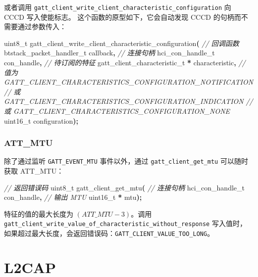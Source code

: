 \documentclass[
  12pt,
]{book}
\newenvironment{Shaded}{\begin{snugshade}}{\end{snugshade}}
\newcommand{\CommentTok}[1]{\textcolor[rgb]{0.56,0.35,0.01}{\textit{#1}}}
\newcommand{\DataTypeTok}[1]{\textcolor[rgb]{0.13,0.29,0.53}{#1}}
\newcommand{\NormalTok}[1]{#1}
\newcommand{\OperatorTok}[1]{\textcolor[rgb]{0.81,0.36,0.00}{\textbf{#1}}}
\begin{document}
\begin{enumerate}
  或者调用 \texttt{gatt\_client\_write\_client\_characteristic\_configuration} 向 CCCD 写入使能标志。
  这个函数的原型如下，它会自动发现 CCCD 的句柄而不需要通过参数传入：

\begin{Shaded}
\begin{Highlighting}[]
\DataTypeTok{uint8\_t}\NormalTok{ gatt\_client\_write\_client\_characteristic\_configuration}\OperatorTok{(}
    \CommentTok{// 回调函数}
\NormalTok{    btstack\_packet\_handler\_t callback}\OperatorTok{,}
    \CommentTok{// 连接句柄}
\NormalTok{    hci\_con\_handle\_t con\_handle}\OperatorTok{,}
    \CommentTok{// 待订阅的特征}
\NormalTok{    gatt\_client\_characteristic\_t }\OperatorTok{*}\NormalTok{ characteristic}\OperatorTok{,}
    \CommentTok{// 值为 GATT\_CLIENT\_CHARACTERISTICS\_CONFIGURATION\_NOTIFICATION}
    \CommentTok{// 或   GATT\_CLIENT\_CHARACTERISTICS\_CONFIGURATION\_INDICATION}
    \CommentTok{// 或   GATT\_CLIENT\_CHARACTERISTICS\_CONFIGURATION\_NONE}
    \DataTypeTok{uint16\_t}\NormalTok{ configuration}\OperatorTok{);}
\end{Highlighting}
\end{Shaded}

  \hypertarget{att_mtu-1}{%
  \subsection{ATT\_MTU}\label{att_mtu-1}}
\end{enumerate}

除了通过监听 \texttt{GATT\_EVENT\_MTU} 事件以外，通过 \texttt{gatt\_client\_get\_mtu} 可以随时获取 ATT\_MTU：

\begin{Shaded}
\begin{Highlighting}[]
\CommentTok{// 返回错误码}
\DataTypeTok{uint8\_t}\NormalTok{ gatt\_client\_get\_mtu}\OperatorTok{(}
    \CommentTok{// 连接句柄}
\NormalTok{    hci\_con\_handle\_t con\_handle}\OperatorTok{,}
    \CommentTok{// 输出 MTU}
    \DataTypeTok{uint16\_t} \OperatorTok{*}\NormalTok{ mtu}\OperatorTok{);}
\end{Highlighting}
\end{Shaded}

特征的值的最大长度为 \((ATT\_MTU - 3)\)。调用 \texttt{gatt\_client\_write\_value\_of\_characteristic\_without\_response} 写入值时，
如果超过最大长度，会返回错误码：\texttt{GATT\_CLIENT\_VALUE\_TOO\_LONG}。

\hypertarget{ch-l2cap}{%
\chapter{L2CAP}\label{ch-l2cap}}
\end{document}
